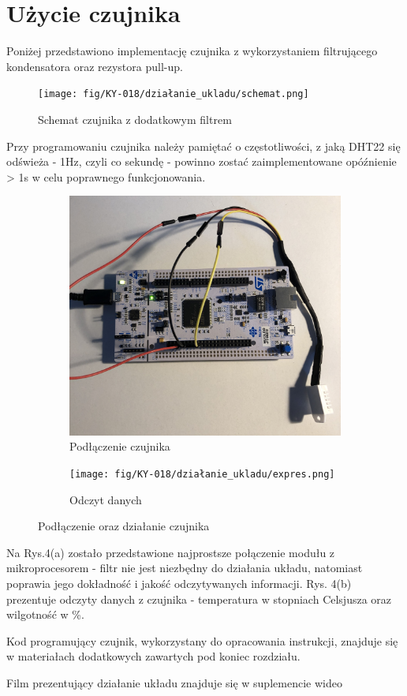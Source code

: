 \documentclass[11pt, a4paper]{article}
\begin{document}
\newpage
\section*{Użycie czujnika}

Poniżej przedstawiono implementację czujnika z wykorzystaniem filtrującego kondensatora oraz rezystora pull-up.

\vspace{0.5cm}
\begin{figure}[h!]
    \centering
    \texttt{[image: fig/KY-018/działanie\_ukladu/schemat.png]}
    \caption{Schemat czujnika z dodatkowym filtrem}
    \label{fig:my_label}
\end{figure}

Przy programowaniu czujnika należy pamiętać o częstotliwości, z jaką DHT22 się odświeża - 1Hz, czyli co sekundę - powinno zostać zaimplementowane opóźnienie > 1s w celu poprawnego funkcjonowania.

\begin{figure}[h!]
\centering
\begin{subfigure}{.5\textwidth}
  \centering
  \includegraphics[width=.7\linewidth]{fig/KY-018/polaczenie_modulu/uklad.jpg}
  \caption{Podłączenie czujnika}
  \label{fig:sub1}
\end{subfigure}%
\begin{subfigure}{.5\textwidth}
  \centering
  \texttt{[image: fig/KY-018/działanie\_ukladu/expres.png]}
  \caption{Odczyt danych}
\end{subfigure}
\caption{Podłączenie oraz działanie czujnika}
\label{fig:test}
\end{figure}
Na Rys.4(a) zostało przedstawione najprostsze połączenie modułu z mikroprocesorem - filtr nie jest niezbędny do działania układu, natomiast poprawia jego dokładność i jakość odczytywanych informacji. Rys. 4(b) prezentuje odczyty danych z czujnika - temperatura w stopniach Celsjusza oraz wilgotność w \%.
\newline

Kod programujący czujnik, wykorzystany do opracowania instrukcji, znajduje się w materiałach dodatkowych zawartych pod koniec rozdziału.

Film prezentujący działanie układu znajduje się w suplemencie wideo

\newpage

\printbibliography[heading=bibintoc]
\end{document}
